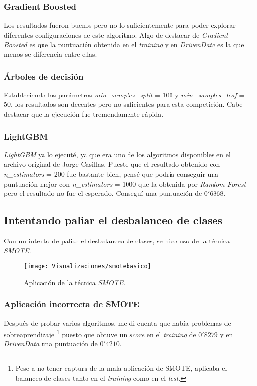 \documentclass[paper=a4, fontsize=12pt]{article} %
\numberwithin{equation}{section} %
\numberwithin{figure}{section} %
\numberwithin{table}{section} %
\begin{document}
\subsubsection{Gradient Boosted}
Los resultados fueron buenos pero no lo suficientemente para poder explorar diferentes configuraciones de este algoritmo. Algo de destacar de \textit{Gradient Boosted} es que la puntuación obtenida en el \textit{training} y en \textit{DrivenData} es la que menos se diferencia entre ellas.

\subsubsection{Árboles de decisión}
Estableciendo los parámetros \textit{min\_samples\_split} = 100 y \textit{min\_samples\_leaf} = 50, los resultados son decentes pero no suficientes para esta competición. Cabe destacar que la ejecución fue tremendamente rápida.

\subsubsection{LightGBM}
\textit{LightGBM} ya lo ejecuté, ya que era uno de los algoritmos disponibles en el archivo original de Jorge Casillas. Puesto que el resultado obtenido con \textit{n\_estimators} = 200 fue bastante bien, pensé que podría conseguir una puntuación mejor con \textit{n\_estimators} = 1000 que la obtenida por \textit{Random Forest} pero el resultado no fue el esperado. Conseguí una puntuación de $0'6868$.

\subsection{Intentando paliar el desbalanceo de clases}

Con un intento de paliar el desbalanceo de clases, se hizo uso de la técnica \textit{SMOTE}.

\begin{figure}[H]
  \centering
  \texttt{[image: Visualizaciones/smotebasico]}
  \caption{Aplicación de la técnica \textit{SMOTE}.}
  \label{smote}
\end{figure}

\subsubsection{Aplicación incorrecta de SMOTE}
Después de probar varios algoritmos, me di cuenta que había problemas de sobreaprendizaje \footnote{Pese a no tener captura de la mala aplicación de SMOTE, aplicaba el balanceo de clases tanto en el \textit{training} como en el \textit{test}.} puesto que obtuve un \textit{score} en el \textit{training} de $0'8279$ y en \textit{DrivenData} una puntuación de $0'4210$.
\end{document}
